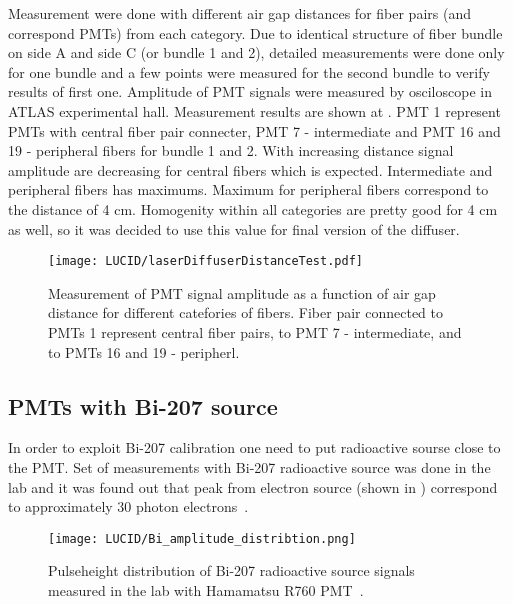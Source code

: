 Measurement were done with different air gap distances for fiber pairs (and correspond PMTs) from each category. 
Due to identical structure of fiber bundle on side A and side C (or bundle 1 and 2), detailed measurements
were done only for one bundle and a few points were measured for the second bundle to verify results of first one. Amplitude of PMT signals were measured by 
osciloscope in ATLAS experimental hall. Measurement results are shown at . PMT 1 represent PMTs with central fiber 
pair connecter, PMT 7 - intermediate and PMT 16 and 19 - peripheral fibers for bundle 1 and 2. 
With increasing distance signal amplitude are decreasing for central fibers which is expected. 
Intermediate and peripheral fibers has maximums. Maximum for peripheral fibers correspond to the distance of 4 cm.
Homogenity within all categories are pretty good for 4 cm as well, so it was decided to use this value for final version of the diffuser.



\begin{figure}
\centering
\texttt{[image: LUCID/laserDiffuserDistanceTest.pdf]}
\caption{Measurement of PMT signal amplitude as a function of air gap distance for different catefories of fibers. Fiber pair connected to PMTs 1 represent 
central fiber pairs, to PMT 7 - intermediate, and to PMTs 16 and 19 - peripherl.}
\label{fig:laserDiffuserDistanceTest}
\end{figure}


\subsection{PMTs with Bi-207 source}
\label{subsec:bi207Calibration}

In order to exploit Bi-207 calibration one need to put radioactive sourse close to the PMT.
Set of measurements with Bi-207 radioactive source was done in the lab and it was found out that peak from electron source 
(shown in ) correspond to approximately 30 photon electrons~\cite{Alberghi:2016tad}.

\begin{figure}
\centering
\texttt{[image: LUCID/Bi\_amplitude\_distribtion.png]}
\caption{Pulseheight distribution of Bi-207 radioactive source signals measured in the lab with Hamamatsu R760 PMT~\cite{Alberghi:2016tad}.}
\label{fig:pulseheight_Bi207}
\end{figure}


